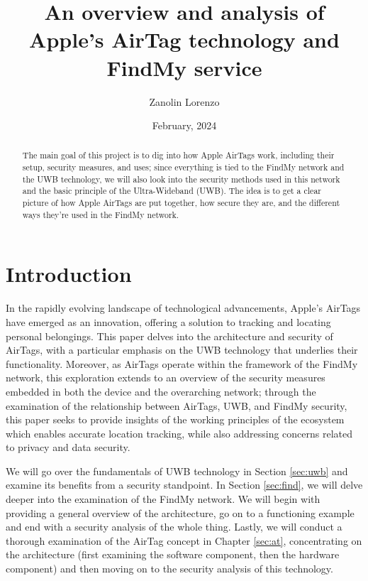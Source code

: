 \documentclass[english]{article}
\title{An overview and analysis of Apple’s AirTag technology and FindMy service}
\author{Zanolin Lorenzo}
\date{February, 2024}
\begin{document}
\maketitle

\tableofcontents
\newpage


\begin{abstract}
  The main goal of this project is to dig into how Apple AirTags work, including their setup, security measures, and uses; since everything is tied to the FindMy network and the UWB technology, we will also look into the security methods used in this network and the basic principle of the Ultra-Wideband (UWB). The idea is to get a clear picture of how Apple AirTags are put together, how secure they are, and the different ways they're used in the FindMy network.
\end{abstract}

\section{Introduction}\label{sec:intro}
In the rapidly evolving landscape of technological advancements, Apple's AirTags have emerged as an innovation, offering a solution to tracking and locating personal belongings. This paper delves into the architecture and security of AirTags, with a particular emphasis on the UWB technology that underlies their functionality. Moreover, as AirTags operate within the framework of the FindMy network, this exploration extends to an overview of the security measures embedded in both the device and the overarching network; through the examination of the relationship between AirTags, UWB, and FindMy security, this paper seeks to provide insights of the working principles of the ecosystem which enables accurate location tracking, while also addressing concerns related to privacy and data security.

We will go over the fundamentals of UWB technology in Section \ref{sec:uwb} and examine its benefits from a security standpoint. In Section \ref{sec:find}, we will delve deeper into the examination of the FindMy network. We will begin with providing a general overview of the architecture, go on to a functioning example and end with a security analysis of the whole thing. Lastly, we will conduct a thorough examination of the AirTag concept in Chapter \ref{sec:at}, concentrating on the architecture (first examining the software component, then the hardware component) and then moving on to the security analysis of this technology.
\end{document}
